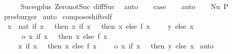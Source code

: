 \begin{isabellebody}
\ \ \ \ \isamarkupfalse%
\ Suc{\isacharunderscore}{\kern0pt}eq{\isacharunderscore}{\kern0pt}plus{}\ Zero{\isacharunderscore}{\kern0pt}not{\isacharunderscore}{\kern0pt}Suc\ diff{\isacharunderscore}{\kern0pt}Suc{\isacharunderscore}{\kern0pt}{}\ \isamarkupfalse%
\ auto\isanewline
\ \ \isamarkupfalse%
\ {\isacharquery}{\kern0pt}case\isanewline
\ \ \isamarkupfalse%
\ auto\isanewline
\ \ \isamarkupfalse%
\ Nu\ P{}\ \isamarkupfalse%
\ presburger\isanewline
{}\isamarkupfalse%
\ auto%
\endisatagproof
{\isafoldproof}%
%
\isadelimproof
\isanewline
%
\endisadelimproof
\isanewline
\isanewline
{}\isamarkupfalse%
\ compose{\isacharunderscore}{\kern0pt}shifted{\isacharunderscore}{\kern0pt}f{\isacharcolon}{\kern0pt}\isanewline
\ \ {\isachardoublequoteopen}{\isacharparenleft}{\kern0pt}{\isasymlambda}x\ {\isacharcolon}{\kern0pt}{\isacharcolon}{\kern0pt}\ nat{\isachardot}{\kern0pt}\ if\ x\ {\isacharequal}{\kern0pt}\ {}\ then\ {\isacharparenleft}{\kern0pt}{\isasymlambda}x{\isachardot}{\kern0pt}\ if\ x\ {\isacharequal}{\kern0pt}\ {}\ then\ x\ else\ f\ {\isacharparenleft}{\kern0pt}x\ {\isacharminus}{\kern0pt}\ {}{\isacharparenright}{\kern0pt}\ {\isacharplus}{\kern0pt}\ {}{\isacharparenright}{\kern0pt}\ y\ else\ x{\isacharparenright}{\kern0pt}\isanewline
\ \ \ \ \ \ o\ {\isacharparenleft}{\kern0pt}{\isasymlambda}x{\isachardot}{\kern0pt}\ if\ x\ {\isacharequal}{\kern0pt}\ {}\ then\ x\ else\ f\ {\isacharparenleft}{\kern0pt}x\ {\isacharminus}{\kern0pt}\ {}{\isacharparenright}{\kern0pt}\ {\isacharplus}{\kern0pt}\ {}{\isacharparenright}{\kern0pt}\ {\isacharequal}{\kern0pt}\isanewline
\ \ \ \ \ {\isacharparenleft}{\kern0pt}{\isasymlambda}x{\isachardot}{\kern0pt}\ if\ x\ {\isacharequal}{\kern0pt}\ {}\ then\ x\ else\ f\ {\isacharparenleft}{\kern0pt}x\ {\isacharminus}{\kern0pt}\ {}{\isacharparenright}{\kern0pt}\ {\isacharplus}{\kern0pt}\ {}{\isacharparenright}{\kern0pt}\ o\ {\isacharparenleft}{\kern0pt}{\isasymlambda}x{\isachardot}{\kern0pt}\ if\ x\ {\isacharequal}{\kern0pt}\ {}\ then\ y\ else\ x{\isacharparenright}{\kern0pt}{\isachardoublequoteclose}\isanewline
%
\isadelimproof
%
\endisadelimproof
%
\isatagproof
{}\isamarkupfalse%
\ auto%
\endisatagproof
{\isafoldproof}%
%
\isadelimproof
\isanewline
%
\endisadelimproof
\isanewline
\isanewline
{}\isamarkupfalse%

\end{isabellebody}
